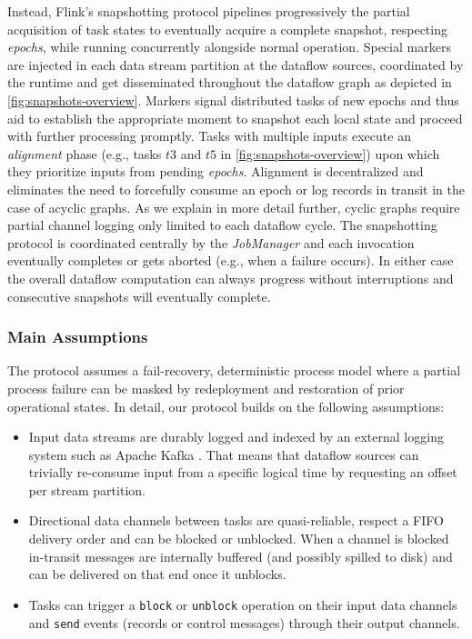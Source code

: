 Instead, Flink's snapshotting protocol pipelines progressively the partial acquisition of task states to eventually acquire a complete snapshot, respecting \emph{epochs}, while running concurrently alongside normal operation. Special markers are injected in each data stream partition at the dataflow sources, coordinated by the runtime and get disseminated throughout the dataflow graph as depicted in \autoref{fig:snapshots-overview}. Markers signal distributed tasks of new epochs and thus aid to establish the appropriate moment to snapshot each local state and proceed with further processing promptly. Tasks with multiple inputs execute an \emph{alignment} phase (e.g., tasks $t3$ and $t5$ in \autoref{fig:snapshots-overview}) upon which they prioritize inputs from pending \emph{epochs}. Alignment is decentralized and eliminates the need to forcefully consume an epoch or log records in transit in the case of acyclic graphs. As we explain in more detail further, cyclic graphs require partial channel logging only limited to each dataflow cycle. The snapshotting protocol is coordinated centrally by the \emph{JobManager} and each invocation eventually completes or gets aborted (e.g., when a failure occurs). In either case the overall dataflow computation can always progress without interruptions and consecutive snapshots will eventually complete.

\subsubsection{Main Assumptions}

The protocol assumes a fail-recovery, deterministic process model \cite{elnozahy2002survey} where a partial process failure can be masked by redeployment and restoration of prior operational states. In detail, our protocol builds on the following assumptions:

\begin{itemize}
	\item Input data streams are durably logged and indexed by an external logging system such as Apache Kafka \cite{kreps2011kafka}. That means that dataflow sources can trivially re-consume input from a specific logical time by requesting an offset per stream partition. 
	\item Directional data channels between tasks are quasi-reliable, respect a FIFO delivery order and can be blocked or unblocked. When a channel is blocked in-transit messages are internally buffered (and possibly spilled to disk) and can be delivered on that end once it unblocks.
	\item Tasks can trigger a \texttt{block} or \texttt{unblock} operation on their input data channels and \texttt{send} events (records or control messages) through their output channels.
\end{itemize}

